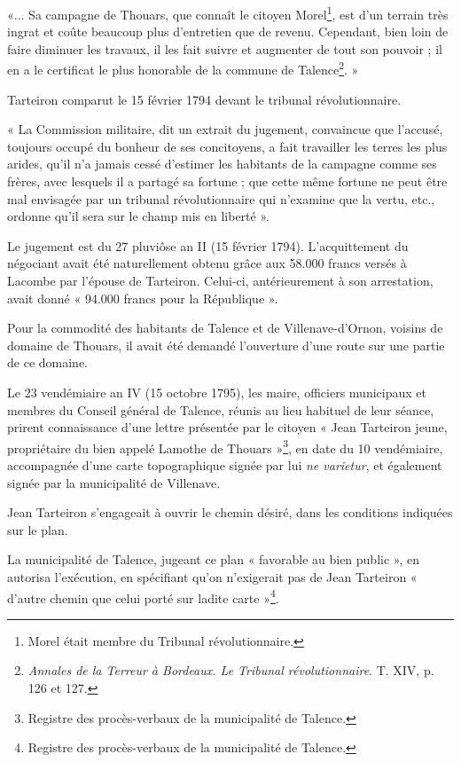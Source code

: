 «... Sa campagne de Thouars, que connaît le citoyen Morel\footnote{Morel était membre du Tribunal révolutionnaire.}, est d'un terrain très ingrat et coûte beaucoup plus d'entretien que de revenu. Cependant, bien loin de faire diminuer les travaux, il les fait suivre et augmenter de tout son pouvoir ; il en a le certificat le plus honorable de la commune de Talence\footnote{\textit{Annales de la Terreur à Bordeaux. Le Tribunal révolutionnaire}. T. XIV, p. 126 et 127.}. »

Tarteiron comparut le 15 février 1794 devant le tribunal révolutionnaire.

« La Commission militaire, dit un extrait du jugement, convaincue que l'accusé, toujours occupé du bonheur de ses concitoyens, a fait travailler les terres les plus arides, qu'il n'a jamais cessé d'estimer les habitants de la campagne comme ses frères, avec lesquels il a partagé sa fortune ; que cette même fortune ne peut être mal envisagée par un tribunal révolutionnaire qui n'examine que la vertu, etc., ordonne qu'il sera sur le champ mis en liberté ».

Le jugement est du 27 pluviôse an II (15 février 1794). L'acquittement du négociant avait été naturellement obtenu grâce aux 58.000 francs versés à Lacombe par l'épouse de Tarteiron. Celui-ci, antérieurement à son arrestation, avait donné « 94.000 francs pour la République ».

Pour la commodité des habitants de Talence et de Villenave-d'Ornon, voisins de domaine de Thouars, il avait été demandé l'ouverture d'une route sur une partie de ce domaine.

Le 23 vendémiaire an IV (15 octobre 1795), les maire, officiers municipaux et membres du Conseil général de Talence, réunis au lieu habituel de leur séance, prirent connaissance d'une lettre présentée par le citoyen « Jean Tarteiron jeune, propriétaire du bien appelé Lamothe de Thouars »\footnote{Registre des procès-verbaux de la municipalité de Talence.}, en date du 10 vendémiaire, accompagnée d'une carte topographique signée par lui \textit{ne varietur}, et également signée par la municipalité de Villenave. 

Jean Tarteiron s'engageait à ouvrir le chemin désiré, dans les conditions indiquées sur le plan.

La municipalité de Talence, jugeant ce plan « favorable au bien public », en autorisa l'exécution, en spécifiant qu'on n'exigerait pas de Jean Tarteiron « d'autre chemin que celui porté sur ladite carte »\footnote{Registre des procès-verbaux de la municipalité de Talence.}.

